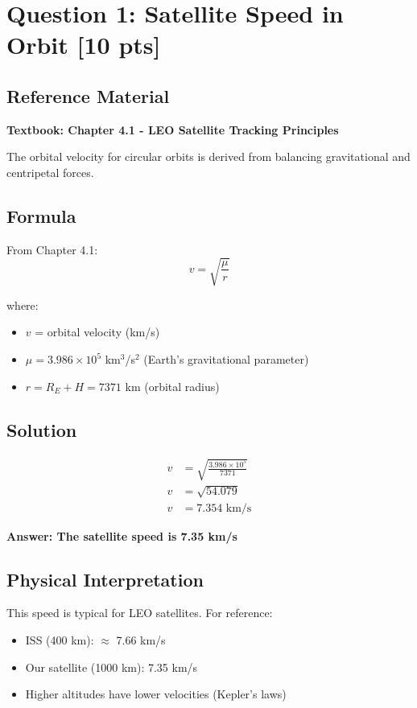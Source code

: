 \documentclass[11pt,letterpaper]{article}
\begin{document}
\section{Question 1: Satellite Speed in Orbit [10 pts]}

\subsection{Reference Material}
\textbf{Textbook: Chapter 4.1 - LEO Satellite Tracking Principles}

The orbital velocity for circular orbits is derived from balancing gravitational and centripetal forces.

\subsection{Formula}
From Chapter 4.1:
\begin{equation}
v = \sqrt{\frac{\mu}{r}}
\end{equation}

where:
\begin{itemize}
    \item $v$ = orbital velocity (km/s)
    \item $\mu = 3.986 \times 10^5$ km$^3$/s$^2$ (Earth's gravitational parameter)
    \item $r = R_E + H = 7371$ km (orbital radius)
\end{itemize}

\subsection{Solution}
\begin{align}
v &= \sqrt{\frac{3.986 \times 10^5}{7371}} \\
v &= \sqrt{54.079} \\
v &= 7.354 \text{ km/s}
\end{align}

\textbf{Answer: The satellite speed is 7.35 km/s}

\subsection{Physical Interpretation}
This speed is typical for LEO satellites. For reference:
\begin{itemize}
    \item ISS (400 km): $\approx$ 7.66 km/s
    \item Our satellite (1000 km): 7.35 km/s
    \item Higher altitudes have lower velocities (Kepler's laws)
\end{itemize}
\end{document}
